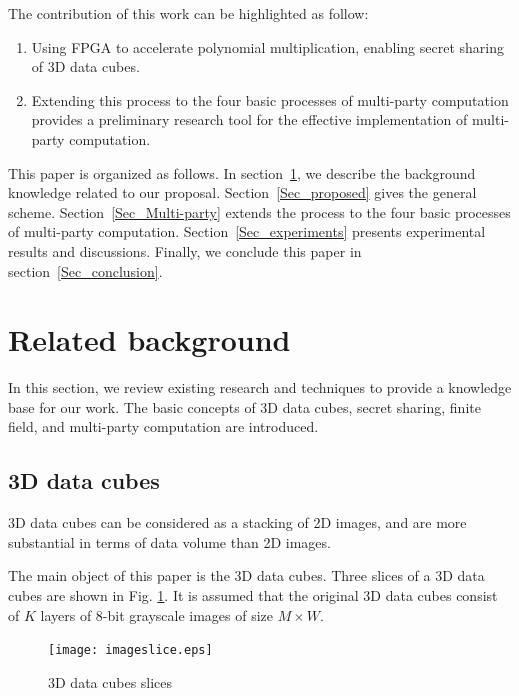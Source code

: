 The contribution of this work can be highlighted as follow:
\begin{enumerate}
	\item Using FPGA to accelerate polynomial multiplication, enabling secret sharing of 3D data cubes.
	\item Extending this process to the four basic processes of multi-party computation provides a preliminary research tool for the effective implementation of multi-party computation.
\end{enumerate}

This paper is organized as follows. In section~\ref{Sec_relatedworks}, we describe the background knowledge related to our proposal. Section~\ref{Sec_proposed} gives the general scheme. Section~\ref{Sec_Multi-party} extends the process to the four basic processes of multi-party computation. Section~\ref{Sec_experiments} presents experimental results and discussions. Finally, we conclude this paper in section~\ref{Sec_conclusion}.

\section{Related background}\label{Sec_relatedworks}

In this section, we review existing research and techniques to provide a knowledge base for our work. The basic concepts of 3D data cubes, secret sharing, finite field, and multi-party computation are introduced.

\subsection{3D data cubes }\label{(2,2)-VC}

3D data cubes can be considered as a stacking of 2D images, and are more substantial in terms of data volume than 2D images.

The main object of this paper is the 3D data cubes. Three slices of a 3D data cubes are shown in Fig. \ref{fig01}. It is assumed that the original 3D data cubes consist of $K$ layers of 8-bit grayscale images of size $M\times W$.

\begin{figure}[!htb]
	\begin{center}
		\texttt{[image: imageslice.eps]}\\
		\caption{3D data cubes slices}
		\label{fig01}
		\vspace{-5.0em}
	\end{center}
\end{figure}

